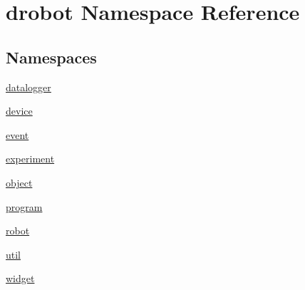 \hypertarget{namespacedrobot}{\section{drobot Namespace Reference}
\label{namespacedrobot}
}
\subsection*{Namespaces}
\begin{DoxyCompactItemize}
\item 
\hyperlink{namespacedrobot_1_1datalogger}{datalogger}
\item 
\hyperlink{namespacedrobot_1_1device}{device}
\item 
\hyperlink{namespacedrobot_1_1event}{event}
\item 
\hyperlink{namespacedrobot_1_1experiment}{experiment}
\item 
\hyperlink{namespacedrobot_1_1object}{object}
\item 
\hyperlink{namespacedrobot_1_1program}{program}
\item 
\hyperlink{namespacedrobot_1_1robot}{robot}
\item 
\hyperlink{namespacedrobot_1_1util}{util}
\item 
\hyperlink{namespacedrobot_1_1widget}{widget}
\end{DoxyCompactItemize}
